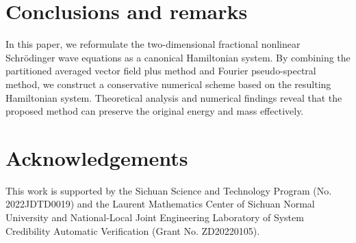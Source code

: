 \documentclass[preprint,compress,3p,10pt,fleqn]{elsarticle}
\numberwithin{equation}{section}
\begin{document}
	\section{Conclusions and remarks}\label{Section 5}
	In this paper, we reformulate the two-dimensional fractional nonlinear Schr{\"o}dinger wave equations as a canonical Hamiltonian system. By combining the partitioned averaged vector field plus method and Fourier pseudo-spectral method, we construct a conservative numerical scheme based on the resulting Hamiltonian system. Theoretical analysis and numerical findings reveal that the proposed method can preserve the original energy and mass effectively.
	
	\section*{Acknowledgements}
	This work is supported by the Sichuan Science and Technology Program (No. 2022JDTD0019) and the Laurent Mathematics Center of Sichuan Normal University and National-Local Joint Engineering Laboratory of System Credibility Automatic Verification (Grant No. ZD20220105).
		



% 
% 

\end{document}
